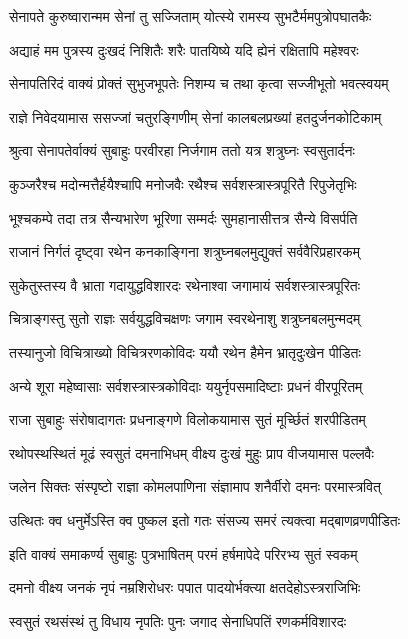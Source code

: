 \twolineshloka
{सेनापते कुरुष्वारान्मम सेनां तु सज्जिताम्}
{योत्स्ये रामस्य सुभटैर्ममपुत्रोपघातकैः}%

\twolineshloka
{अद्याहं मम पुत्रस्य दुःखदं निशितैः शरैः}
{पातयिष्ये यदि ह्येनं रक्षितापि महेश्वरः}%

\twolineshloka
{सेनापतिरिदं वाक्यं प्रोक्तं सुभुजभूपतेः}
{निशम्य च तथा कृत्वा सज्जीभूतो भवत्स्वयम्}%

\twolineshloka
{राज्ञे निवेदयामास ससज्जां चतुरङ्गिणीम्}
{सेनां कालबलप्रख्यां हतदुर्जनकोटिकाम्}%

\twolineshloka
{श्रुत्वा सेनापतेर्वाक्यं सुबाहुः परवीरहा}
{निर्जगाम ततो यत्र शत्रुघ्नः स्वसुतार्दनः}%

\twolineshloka
{कुञ्जरैश्च मदोन्मत्तैर्हयैश्चापि मनोजवैः}
{रथैश्च सर्वशस्त्रास्त्रपूरितै रिपुजेतृभिः}%

\twolineshloka
{भूश्चकम्पे तदा तत्र सैन्यभारेण भूरिणा}
{सम्मर्दः सुमहानासीत्तत्र सैन्ये विसर्पति}%

\twolineshloka
{राजानं निर्गतं दृष्ट्वा रथेन कनकाङ्गिना}
{शत्रुघ्नबलमुद्युक्तं सर्ववैरिप्रहारकम्}%

\twolineshloka
{सुकेतुस्तस्य वै भ्राता गदायुद्धविशारदः}
{रथेनाश्वा जगामायं सर्वशस्त्रास्त्रपूरितः}%

\twolineshloka
{चित्राङ्गस्तु सुतो राज्ञः सर्वयुद्धविचक्षणः}
{जगाम स्वरथेनाशु शत्रुघ्नबलमुन्मदम्}%

\twolineshloka
{तस्यानुजो विचित्राख्यो विचित्ररणकोविदः}
{ययौ रथेन हैमेन भ्रातृदुःखेन पीडितः}%

\twolineshloka
{अन्ये शूरा महेष्वासाः सर्वशस्त्रास्त्रकोविदाः}
{ययुर्नृपसमादिष्टाः प्रधनं वीरपूरितम्}%

\twolineshloka
{राजा सुबाहुः संरोषादागतः प्रधनाङ्गणे}
{विलोकयामास सुतं मूर्च्छितं शरपीडितम्}%

\twolineshloka
{रथोपस्थस्थितं मूढं स्वसुतं दमनाभिधम्}
{वीक्ष्य दुःखं मुहुः प्राप वीजयामास पल्लवैः}%

\twolineshloka
{जलेन सिक्तः संस्पृष्टो राज्ञा कोमलपाणिना}
{संज्ञामाप शनैर्वीरो दमनः परमास्त्रवित्}%

\twolineshloka
{उत्थितः क्व धनुर्मेऽस्ति क्व पुष्कल इतो गतः}
{संसज्य समरं त्यक्त्वा मद्बाणव्रणपीडितः}%

\twolineshloka
{इति वाक्यं समाकर्ण्य सुबाहुः पुत्रभाषितम्}
{परमं हर्षमापेदे परिरभ्य सुतं स्वकम्}%

\twolineshloka
{दमनो वीक्ष्य जनकं नृपं नम्रशिरोधरः}
{पपात पादयोर्भक्त्या क्षतदेहोऽस्त्रराजिभिः}%

\twolineshloka
{स्वसुतं रथसंस्थं तु विधाय नृपतिः पुनः}
{जगाद सेनाधिपतिं रणकर्मविशारदः}%

